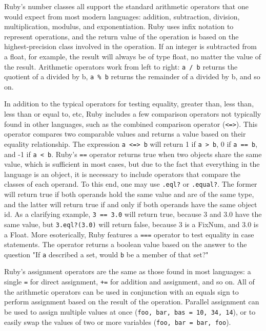\documentclass[12pt]{article}
\begin{document}
Ruby's number classes all support the standard arithmetic operators that one would expect from most modern languages: addition, subtraction, division, multiplication, modulus, and exponentiation. Ruby uses infix notation to represent operations, and the return value of the operation is based on the highest-precision class involved in the operation. If an integer is subtracted from a float, for example, the result will always be of type float, no matter the value of the result. Arithmetic operators work from left to right: \verb|a / b| returns the quotient of a divided by b, \verb|a % b| returns the remainder of a divided by b, and so on\cite{opstut}.

In addition to the typical operators for testing equality, greater than, less than, less than or equal to, etc, Ruby includes a few comparison operators not typically found in other languages, such as the combined comparison operator (\verb|<=>|). This operator compares two comparable values and returns a value based on their equality relationship. The expression \verb|a <=> b| will return 1 if \verb|a > b|, 0 if \verb|a == b|, and -1 if \verb|a < b|. Ruby's \verb|==| operator returns true when two objects share the same value, which is sufficient in most cases, but due to the fact that everything in the language is an object, it is necessary to include operators that compare the classes of each operand. To this end, one may use \verb|.eql?| or \verb|.equal?|. The former will return true if both operands hold the same value and are of the same type, and the latter will return true if and only if both operands have the same object id. As a clarifying example, \verb|3 == 3.0| will return true, because 3 and 3.0 have the same value, but \verb|3.eql?(3.0)| will return false, because 3 is a FixNum, and 3.0 is a Float. More esoterically, Ruby features a \verb|===| operator to test equality in case statements. The operator returns a boolean value based on the answer to the question "If \verb|a| described a set, would \verb|b| be a member of that set?"\cite{opstut}\cite{mittag}

Ruby's assignment operators are the same as those found in most languages: a single \verb|=| for direct assignment, \verb|+=| for addition and assignment, and so on. All of the arithmetic operators can be used in conjunction with an equals sign to perform assignment based on the result of the operation. Parallel assignment can be used to assign multiple values at once (\verb|foo, bar, bas = 10, 34, 14|), or to easily swap the values of two or more variables (\verb|foo, bar = bar, foo|)\cite{opstut}.
\end{document}
